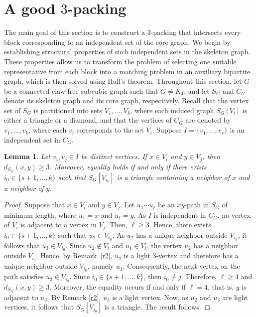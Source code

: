 \documentclass[12pt, oneside]{scrartcl}
\newtheorem{lemma}{Lemma}%
\begin{document}
\section{A good $3$-packing}
The main goal of this section is to construct a $3$-packing that intersects every block corresponding to an independent set of the core graph. We begin by establishing structural properties of such independent sets in the skeleton graph. These properties allow us to transform the problem of selecting one suitable representative from each block into a matching problem in an auxiliary bipartite graph, which is then solved using Hall's theorem.
Throughout this section, let $G$ be a connected claw-free subcubic graph such that $G\neq K_4$, and let $S_G$ and $C_G$ denote its skeleton graph and its core graph, respectively. Recall that the vertex set of $S_G$ is partitioned into sets $V_1,\ldots,V_k$, where each induced graph $S_G[V_i]$ is either a triangle or a diamond,
and that the vertices of $C_G$ are denoted by $v_1,\ldots,v_k$, where each $v_i$ corresponds to the set $V_i$.
Suppose $I=\{v_1,\ldots,v_s\}$ is an independent set in $C_G$.

\begin{lemma}\label{l1}
    Let $v_i,v_j\in I$ be distinct vertices. If $x\in V_i$ and $y\in V_j$, then $d_{S_G}(x,y)\geq 3$. Moreover, equality holds if and only if there exists $i_0\in \{s+1,\dots ,k\}$ such that $S_G[V_{i_0}]$ is a triangle containing a neighbor of $x$ and a neighbor of $y$.
\end{lemma}
\begin{proof}
    Suppose that $x\in V_i$ and $y\in V_j$. Let $u_1\cdots u_{\ell}$ be an $xy$-path in $S_G$ of minimum length, where $u_1=x$ and $u_{\ell}=y$. As $I$ is independent in $C_G$, no vertex of $V_i$ is adjacent to a vertex in $V_j$. Then, $\ell\geq 3$. Hence, there exists $i_0\in \{s+1,\dots ,k\}$ such that $u_2\in V_{i_0}$. As $u_2$ has a unique neighbor outside $V_{i_0}$, it follows that $u_3\in V_{i_0}$. Since $u_2\notin V_i$ and $u_1\in V_i$, the vertex $u_2$ has a neighbor outside $V_{i_0}$. Hence, by Remark~\ref{r2}, $u_2$ is a light $3$-vertex and therefore has a unique neighbor outside $V_{i_0}$, namely $u_1$. Consequently, the next vertex on the path satisfies $u_3\in V_{i_0}$. Since $i_0\in \{s+1,\dots ,k\}$, then $i_0\neq j$. Therefore, $\ell\geq 4$ and $d_{S_G}(x,y)\geq 3$. Moreover, the equality occurs if and only if $\ell=4$, that is, $y$ is adjacent to $u_3$. By Remark \ref{r2}, $u_3$ is a light vertex. Now, as $u_2$ and $u_3$ are light vertices, it follows that $S_G[V_{i_0}]$ is a triangle. The result follows.
\end{proof}
\end{document}
